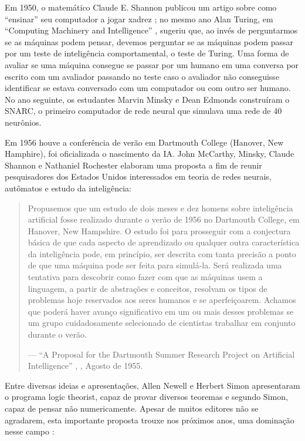 \documentclass[
]{book}
\begin{document}
Em 1950, o matemático Claude E. Shannon publicou um artigo sobre como ``ensinar'' seu computador a jogar xadrez \citep{shannon1950xxii}; no mesmo ano Alan Turing, em ``Computing Machinery and Intelligence'' \citep{turing1950computing},
sugeriu que, ao invés de perguntarmos se as máquinas podem pensar, devemos perguntar se as máquinas podem passar por um teste de inteligência comportamental, o teste de Turing. Uma forma de avaliar se uma máquina consegue se passar por um humano em uma conversa por escrito com um avaliador passando no teste caso o avaliador não conseguisse identificar se estava conversado com um computador ou com outro ser humano. No ano seguinte, os estudantes Marvin Minsky e Dean Edmonds construíram o SNARC, o primeiro computador de rede neural que simulava uma rede de 40 neurônios.

Em 1956 houve a conferência de verão em Dartmouth College (Hanover, New Hamphire), foi oficializada o nascimento da IA. John McCarthy, Minsky, Claude Shannon e Nathaniel Rochester elaboram uma proposta a fim de reunir pesquisadores dos Estados Unidos interessados em teoria de redes neurais, autômatos e estudo da inteligência:

\begin{quote}
Propusemos que um estudo de dois meses e dez homens sobre inteligência artificial fosse realizado durante o verão de 1956 no Dartmouth College, em Hanover, New Hampshire. O estudo foi para prosseguir com a conjectura básica de que cada aspecto de aprendizado ou qualquer outra característica da inteligência pode, em princípio, ser descrita com tanta precisão a ponto de
que uma máquina pode ser feita para simulá-la. Será realizada uma tentativa para descobrir como fazer com que as máquinas usem a linguagem, a partir de abstrações e conceitos, resolvam os tipos
de problemas hoje reservados aos seres humanos e se aperfeiçoarem. Achamos que poderá haver avanço significativo em um ou mais desses problemas se um grupo cuidadosamente selecionado de cientistas trabalhar em conjunto durante o verão.

--- ``A Proposal for the Dartmouth Summer Research Project on Artificial Intelligence'' , \citet{mccarthy2006proposal} , Agosto de 1955.
\end{quote}

Entre diversas ideias e apresentações, Allen Newell e Herbert Simon apresentaram o programa logic theorist, capaz de provar diversos teoremas e segundo Simon, capaz de pensar não numericamente. Apesar de muitos editores não se agradarem, esta importante proposta trouxe nos próximos anos, uma dominação nesse campo \citep{russel2004inteligencia}:
\end{document}

